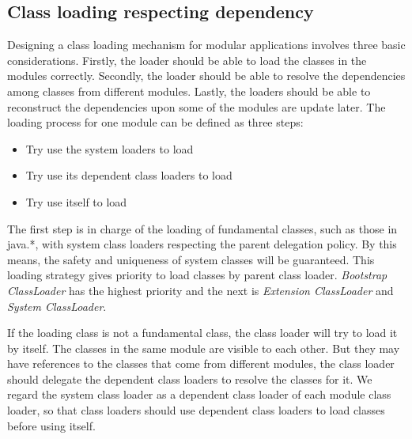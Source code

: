 \documentclass[conference]{IEEEtran}
\begin{document}
\subsection{Class loading respecting dependency}

Designing a class loading mechanism for modular applications involves three basic considerations. Firstly, the loader should be able to load the classes in the modules correctly. Secondly, the loader should be able to resolve the dependencies among classes from different modules. Lastly, the loaders should be able to reconstruct the dependencies upon some of the modules are update later. 
The loading process for one module can be defined as three steps:
\begin{itemize}
\item Try use the system loaders to load
\item Try use its dependent class loaders to load
\item Try use itself to load
\end{itemize}

The first step is in charge of the loading of fundamental classes, such as those in java.*, with system class loaders respecting the parent delegation policy\cite{parent_delegation}. By this means, the safety and uniqueness of system classes will be guaranteed. This loading strategy gives priority to load classes by parent class loader. \emph{Bootstrap ClassLoader} has the highest priority and the next is \emph{Extension ClassLoader} and \emph{System ClassLoader}. 

If the loading class is not a fundamental class, the class loader will try to load it by itself. The classes in the same module are visible to each other. But they may have references to the classes that come from different modules, the class loader should delegate the dependent class loaders to resolve the classes for it. We regard the system class loader as a dependent class loader of each module class loader, so that class loaders should use dependent class loaders to load classes before using itself.
\end{document}
